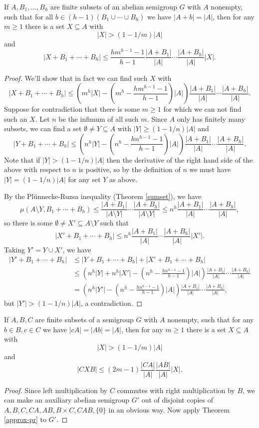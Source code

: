 \begin{thm}\label{approx-pr} If $A,B_1, ..., B_h$ are finite subsets of an abelian semigroup $G$ with $A$ nonempty, such that for all $b \in (h-1)(B_1\cup\cdots\cup B_h)$ we have $|A+b| = |A|$, then for any $m \ge 1$ there is a set $X \subseteq A$ with
\[
|X| > (1-1/m)|A|
\]
and
\[
|X+B_1+\cdots +B_h| \le \frac{hm^{h-1}-1}{h-1}\frac{|A+B_1|}{|A|}\cdots\frac{|A+B_h|}{|A|}|X|.
\]
\end{thm}
\begin{proof} We'll show that in fact we can find such $X$ with
\[
|X+B_1+\cdots +B_h| \le \left(m^h|X|-\left(m^h-\frac{hm^{h-1}-1}{h-1}\right)|A|\right)\frac{|A+B_1|}{|A|}\cdots\frac{|A+B_h|}{|A|}.
\]
Suppose for contradiction that there is some $m \ge 1$ for which we can not find such an $X$. Let $n$ be the infimum of all such $m$. Since $A$ only has finitely many subsets, we can find a set $\emptyset \ne Y\subseteq A$ with $|Y| \ge (1-1/n)|A|$ and
\[
|Y+B_1+\cdots +B_h| \le \left(n^h|Y|-\left(n^h-\frac{hn^{h-1}-1}{h-1}\right)|A|\right)\frac{|A+B_1|}{|A|}\cdots\frac{|A+B_h|}{|A|}.
\]
Note that if $|Y| > (1-1/n)|A|$ then the derivative of the right hand side of the above with respect to $n$ is positive, so by the definition of $n$ we must have $|Y| = (1-1/n)|A|$ for any set $Y$ as above.

By the Pl\"unnecke-Ruzsa inequality (Theorem \ref{sumset}), we have
\[
\mu(A\setminus Y,B_1+\cdots +B_h) \le \frac{|A+B_1|}{|A\setminus Y|}\cdots\frac{|A+B_h|}{|A\setminus Y|} \le n^h\frac{|A+B_1|}{|A|}\cdots\frac{|A+B_h|}{|A|},
\]
so there is some $\emptyset \ne X'\subseteq A\setminus Y$ such that
\[
|X'+B_1+\cdots +B_h| \le n^h\frac{|A+B_1|}{|A|}\cdots\frac{|A+B_h|}{|A|}|X'|.
\]
Taking $Y' = Y\cup X'$, we have
\begin{align*}
|Y'+B_1+\cdots +B_h| &\le |Y+B_1+\cdots +B_h|+|X'+B_1+\cdots +B_h|\\
&\le \left(n^h|Y|+n^h|X'|-\left(n^h-\frac{hn^{h-1}-1}{h-1}\right)|A|\right)\frac{|A+B_1|}{|A|}\cdots\frac{|A+B_h|}{|A|}\\
&= \left(n^h|Y'|-\left(n^h-\frac{hn^{h-1}-1}{h-1}\right)|A|\right)\frac{|A+B_1|}{|A|}\cdots\frac{|A+B_h|}{|A|},
\end{align*}
but $|Y'| > (1-1/n)|A|$, a contradiction.
\end{proof}

\begin{thm}[Ruzsa]\label{approx-noncommute} If $A,B,C$ are finite subsets of a semigroup $G$ with $A$ nonempty, such that for any $b\in B, c\in C$ we have $|cA| = |Ab| = |A|$, then for any $m \ge 1$ there is a set $X \subseteq A$ with
\[
|X| > (1-1/m)|A|
\]
and
\[
|CXB| \le (2m-1)\frac{|CA|}{|A|}\frac{|AB|}{|A|}|X|.
\]
\end{thm}
\begin{proof} Since left multiplication by $C$ commutes with right multiplication by $B$, we can make an auxiliary abelian semigroup $G'$ out of disjoint copies of $A,B,C,CA,AB,B\times C,CAB,\{0\}$ in an obvious way. Now apply Theorem \ref{approx-pr} to $G'$.
\end{proof}

